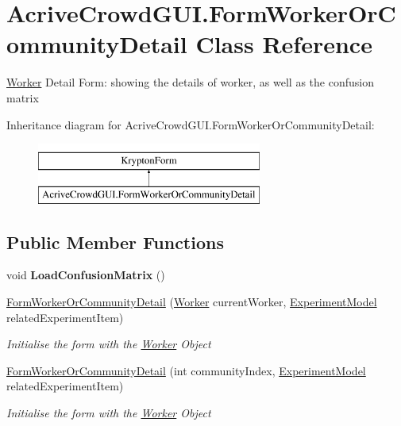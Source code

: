 \hypertarget{class_acrive_crowd_g_u_i_1_1_form_worker_or_community_detail}{}\section{Acrive\+Crowd\+G\+U\+I.\+Form\+Worker\+Or\+Community\+Detail Class Reference}
\label{class_acrive_crowd_g_u_i_1_1_form_worker_or_community_detail}


\hyperlink{class_acrive_crowd_g_u_i_1_1_worker}{Worker} Detail Form\+: showing the details of worker, as well as the confusion matrix  


Inheritance diagram for Acrive\+Crowd\+G\+U\+I.\+Form\+Worker\+Or\+Community\+Detail\+:\begin{figure}[H]
\begin{center}
\leavevmode
\includegraphics[height=2.000000cm]{class_acrive_crowd_g_u_i_1_1_form_worker_or_community_detail}
\end{center}
\end{figure}
\subsection*{Public Member Functions}
\begin{DoxyCompactItemize}
\item 
\hypertarget{class_acrive_crowd_g_u_i_1_1_form_worker_or_community_detail_a24e135b8c94e81b8cfe7b5360c5f5cc1}{}void {\bfseries Load\+Confusion\+Matrix} ()\label{class_acrive_crowd_g_u_i_1_1_form_worker_or_community_detail_a24e135b8c94e81b8cfe7b5360c5f5cc1}

\item 
\hyperlink{class_acrive_crowd_g_u_i_1_1_form_worker_or_community_detail_ab76674f42ad2de6d0cbeb734b6f56c9d}{Form\+Worker\+Or\+Community\+Detail} (\hyperlink{class_acrive_crowd_g_u_i_1_1_worker}{Worker} current\+Worker, \hyperlink{class_acrive_crowd_g_u_i_1_1_experiment_model}{Experiment\+Model} related\+Experiment\+Item)
\begin{DoxyCompactList}\small\item\em Initialise the form with the \hyperlink{class_acrive_crowd_g_u_i_1_1_worker}{Worker} Object \end{DoxyCompactList}\item 
\hyperlink{class_acrive_crowd_g_u_i_1_1_form_worker_or_community_detail_a05f2d2bbd3ab3a5ec2edc74f1888871c}{Form\+Worker\+Or\+Community\+Detail} (int community\+Index, \hyperlink{class_acrive_crowd_g_u_i_1_1_experiment_model}{Experiment\+Model} related\+Experiment\+Item)
\begin{DoxyCompactList}\small\item\em Initialise the form with the \hyperlink{class_acrive_crowd_g_u_i_1_1_worker}{Worker} Object \end{DoxyCompactList}\end{DoxyCompactItemize}
